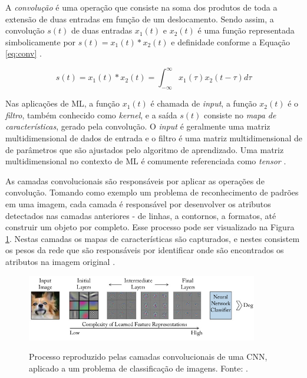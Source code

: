 A \emph{convolução} é uma operação que consiste na soma dos produtos de toda a extensão de duas entradas em função de um deslocamento. Sendo assim, a convolução $s(t)$ de duas entradas $x_1(t)$ e $x_2(t)$ é uma função representada simbolicamente por $s(t) = x_1(t) * x_2(t)$ e definidade conforme a Equação \ref{eq:conv} \cite{lathi}.

\begin{equation}
  \label{eq:conv}
  s(t) = x_1(t) * x_2(t) = \int_{-\infty}^{\infty} x_1(\tau)x_2(t - \tau)d\tau
\end{equation}

Nas aplicações de ML, a função $x_1(t)$ é chamada de \emph{input}, a função $x_2(t)$ é o \emph{filtro}, também conhecido como \emph{kernel}, e a saída $s(t)$ consiste no \emph{mapa de características}, gerado pela convolução. O \emph{input} é geralmente uma matriz multidimensional de dados de entrada e o filtro é uma matriz multidimensional de de parâmetros que são ajustados pelo algoritmo de aprendizado. Uma matriz multidimensional no contexto de ML é comumente referenciada como \emph{tensor} \cite{goodfellow}.

As camadas convolucionais são responsáveis por aplicar as operações de convolução. Tomando como exemplo um problema de reconhecimento de padrões em uma imagem, cada camada é responsável por desenvolver os atributos detectados nas camadas anteriores - de linhas, a contornos, a formatos, até construir um objeto por completo. Esse processo pode ser visualizado na Figura \ref{fig:camadas-convolucionais}. Nestas camadas os mapas de características são capturados, e nestes consistem os pesos da rede que são responsáveis por identificar onde são encontrados os atributos na imagem original \cite{buduma}.

\begin{figure}[h!]
\centering
\caption{Processo reproduzido pelas camadas convolucionais de uma CNN, aplicado a um problema de classificação de imagens. Fonte: \cite{khan}.}
\includegraphics[width=0.9\textwidth]{imgs/camadas-convolucionais}
\label{fig:camadas-convolucionais}
\end{figure}


